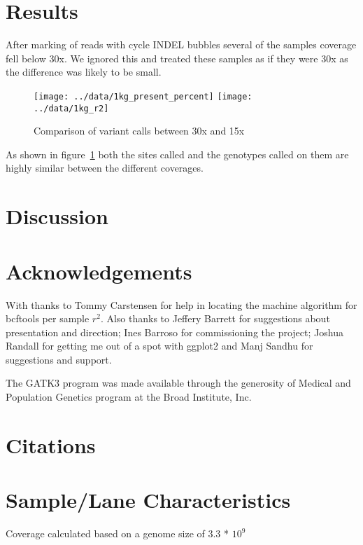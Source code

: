 \documentclass{article}
\begin{document}
  \section{Results}
  {After marking of reads with cycle INDEL bubbles several of the samples coverage fell below 30x. We ignored this and treated these samples as if they were 30x as the difference was likely to be small.}

  \begin{figure}[h]
    \caption{Comparison of variant calls between 30x and 15x}
    \label{fig:compare}
    \texttt{[image: ../data/1kg\_present\_percent]}
    \texttt{[image: ../data/1kg\_r2]}
  \end{figure}

  {As shown in figure~\ref{fig:compare} both the sites called and the genotypes called on them are highly similar between the different coverages.}

  \section{Discussion}

  \section{Acknowledgements}
  With thanks to Tommy Carstensen for help in locating the machine algorithm for bcftools
  per sample $r^{2}$. Also thanks to Jeffery Barrett for suggestions about presentation and direction;
  Ines Barroso for commissioning the project; Joshua Randall for getting me out of a spot
  with ggplot2 and Manj Sandhu for suggestions and support.

  The GATK3 program was made available through the generosity of Medical and
  Population Genetics program at the Broad Institute, Inc.

  \section{Citations}
  {}
  


  \newpage
  \appendix
  \section{Sample/Lane Characteristics}
  \label{app:lanes}
  Coverage calculated based on a genome size of 3.3 * $10^{9}$
  \begin{center}
  \end{center}
\end{document}
